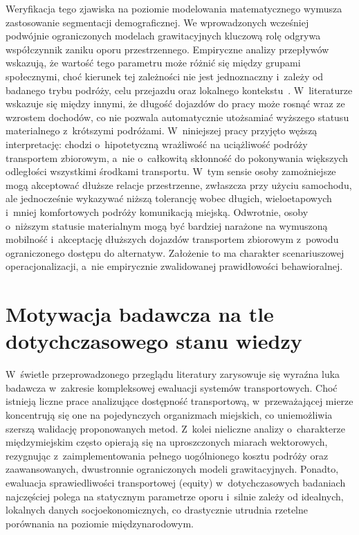 \documentclass{pracamgr}
\begin{document}
Weryfikacja tego zjawiska na poziomie modelowania matematycznego wymusza zastosowanie segmentacji demograficznej. We wprowadzonych wcześniej podwójnie ograniczonych modelach grawitacyjnych kluczową rolę odgrywa współczynnik zaniku oporu przestrzennego. Empiryczne analizy przepływów wskazują, że wartość tego parametru może różnić się między grupami społecznymi, choć kierunek tej zależności nie jest jednoznaczny i~zależy od badanego trybu podróży, celu przejazdu oraz lokalnego kontekstu~\cite{capetown, gravity2}. W~literaturze wskazuje się między innymi, że długość dojazdów do pracy może rosnąć wraz ze wzrostem dochodów, co nie pozwala automatycznie utożsamiać wyższego statusu materialnego z~krótszymi podróżami. W~niniejszej pracy przyjęto węższą interpretację: chodzi o~hipotetyczną wrażliwość na uciążliwość podróży transportem zbiorowym, a~nie o~całkowitą skłonność do pokonywania większych odległości wszystkimi środkami transportu. W~tym sensie osoby zamożniejsze mogą akceptować dłuższe relacje przestrzenne, zwłaszcza przy użyciu samochodu, ale jednocześnie wykazywać niższą tolerancję wobec długich, wieloetapowych i~mniej komfortowych podróży komunikacją miejską. Odwrotnie, osoby o~niższym statusie materialnym mogą być bardziej narażone na wymuszoną mobilność i~akceptację dłuższych dojazdów transportem zbiorowym z~powodu ograniczonego dostępu do alternatyw. Założenie to ma charakter scenariuszowej operacjonalizacji, a~nie empirycznie zwalidowanej prawidłowości behawioralnej.

\section{Motywacja badawcza na tle dotychczasowego stanu wiedzy}\label{section:luka_badawcza}

W~świetle przeprowadzonego przeglądu literatury zarysowuje się wyraźna luka badawcza w~zakresie kompleksowej ewaluacji systemów transportowych. Choć istnieją liczne prace analizujące dostępność transportową, w~przeważającej mierze koncentrują się one na pojedynczych organizmach miejskich, co uniemożliwia szerszą walidację proponowanych metod. Z~kolei nieliczne analizy o~charakterze międzymiejskim często opierają się na uproszczonych miarach wektorowych, rezygnując z~zaimplementowania pełnego uogólnionego kosztu podróży oraz zaawansowanych, dwustronnie ograniczonych modeli grawitacyjnych. Ponadto, ewaluacja sprawiedliwości transportowej (equity) w~dotychczasowych badaniach najczęściej polega na statycznym parametrze oporu i~silnie zależy od idealnych, lokalnych danych socjoekonomicznych, co drastycznie utrudnia rzetelne porównania na poziomie międzynarodowym.
\end{document}
